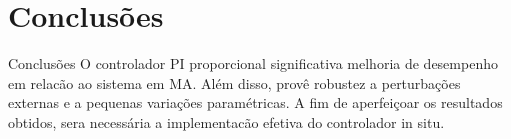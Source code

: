 \documentclass[10pt]{beamer}
\begin{document}
\section{Conclusões}
\begin{frame}[fragile]{Conclusões}
O controlador PI proporcional significativa melhoria de desempenho em relacão ao sistema em MA. Além disso, provê robustez a perturbações externas e a pequenas variações paramétricas. A fim de aperfeiçoar os resultados obtidos, sera necessária a implementacão efetiva do controlador in situ.
\end{frame}







    

\end{document}
